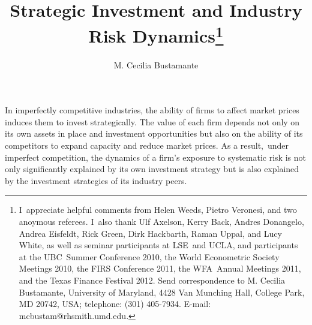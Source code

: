 \documentclass[nogrid,nosurname,sort&compress]{RFS}
\begin{document}
\title{Strategic Investment and Industry Risk Dynamics\protect\footnote{I\ appreciate helpful comments from Helen Weeds, Pietro Veronesi, and two
anoymous referees. I\ also thank Ulf Axelson, Kerry Back, Andres Donangelo, Andrea Eisfeldt,
Rick Green, Dirk Hackbarth, Raman Uppal, and Lucy White, as well as seminar participants at LSE\
and UCLA, and participants at the UBC\ Summer Conference 2010, the World Econometric Society
Meetings 2010, the FIRS Conference 2011, the WFA\ Annual Meetings 2011, and the Texas Finance
Festival 2012. Send correspondence to M. Cecilia Bustamante, University of Maryland, 4428 Van
Munching Hall, College Park, MD 20742, USA; telephone: (301) 405-7934. E-mail:
mcbustam@rhsmith.umd.edu.}}


\author{M. Cecilia {Bustamante}}


\maketitle

In imperfectly competitive industries, the ability of firms to affect market prices induces them
to invest strategically. The value of each firm depends not only on its own assets in place and
investment opportunities but also on the ability of its competitors to expand capacity and reduce
market prices. As a result,\ under imperfect competition, the dynamics of a firm's exposure to
systematic risk is not only significantly explained by its own investment strategy but is also
explained by the investment strategies of its industry peers.
\end{document}
